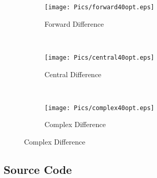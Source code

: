 \documentclass{article}
\begin{document}
\begin{figure}[H]
    \centering
    \caption{Objective Convergence with 20 Nodes}
        \label{fig:opt40}

    \begin{subfigure}[b]{0.45\textwidth}
        \caption{Forward Difference}
        \texttt{[image: Pics/forward40opt.eps]}
        
    \end{subfigure}
    ~ %
    \begin{subfigure}[b]{0.45\textwidth}
        \caption{Central Difference}
        \texttt{[image: Pics/central40opt.eps]}
        
    \end{subfigure}
    ~ %
    \begin{subfigure}[b]{0.45\textwidth}
        \caption{Complex Difference}
        \texttt{[image: Pics/complex40opt.eps]}
        
    \end{subfigure}
\end{figure}


\subsection{Source Code}

\onecolumn

\end{document}
